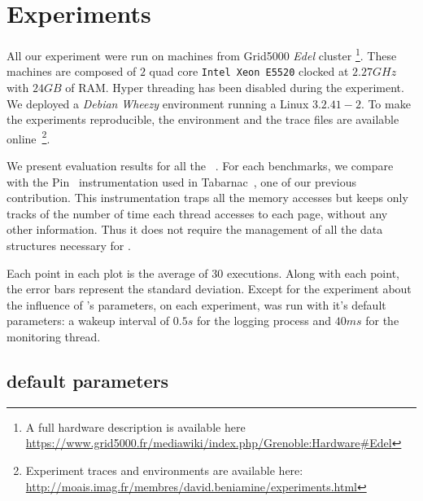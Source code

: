 \section{Experiments}
\label{sec:expe}

\label{sec:exp-methodo}


All our experiment were run on  machines from Grid5000 \emph{Edel} cluster
\footnote{A full hardware description is available here\\
    \url{https://www.grid5000.fr/mediawiki/index.php/Grenoble:Hardware\#Edel}}.
    These machines are composed of $2$ quad core \texttt{Intel Xeon E5520}
    clocked at $2.27GHz$ with
    $24 GB$ of RAM. Hyper threading has been disabled during the experiment.
We deployed a \emph{Debian} \emph{Wheezy} environment running a Linux $3.2.41-2$.
To make the experiments reproducible, the environment and the trace files are
available
online~\footnote{Experiment traces and environments are available here:\\ \url{http://moais.imag.fr/membres/david.beniamine/experiments.html}}.

We present evaluation results for all the \NPB~\cite{Jin1999}. For
each benchmarks, we compare \Moca with the Pin~\cite{Luk05Pin} instrumentation
used in Tabarnac~\cite{Beniamine15TABARNACRR}, one of our previous contribution. This instrumentation traps all the
memory accesses but keeps only tracks of the number of time each thread accesses to
each page, without any other information. Thus it does not require the management
of all the data structures necessary for \Moca.

Each point in each plot is the average of $30$ executions. Along with each point,
the error bars represent the standard deviation.
Except for the experiment about the influence of \Moca's parameters, on each
experiment, \Moca was run with it's default parameters: a wakeup interval of
$0.5s$ for the logging process and $40ms$ for the monitoring thread.

\subsection{\Moca default parameters}
\label{sec:expe-ovh}

